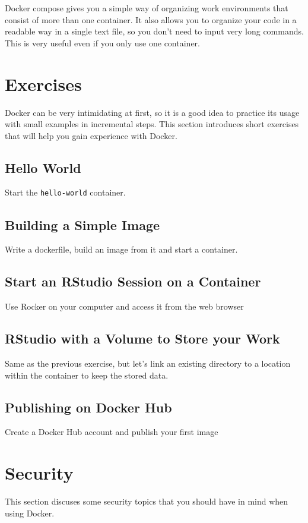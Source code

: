 \documentclass[]{book}
\begin{document}
Docker compose gives you a simple way of organizing work environments that consist of more than one container. It also allows you to organize your code in a readable way in a single text file, so you don't need to input very long commands. This is very useful even if you only use one container.

\hypertarget{exercises}{%
\chapter{Exercises}\label{exercises}}

Docker can be very intimidating at first, so it is a good idea to practice its usage with small examples in incremental steps. This section introduces short exercises that will help you gain experience with Docker.

\hypertarget{hello-world}{%
\section{Hello World}\label{hello-world}}

Start the \texttt{hello-world} container.

\hypertarget{building-a-simple-image}{%
\section{Building a Simple Image}\label{building-a-simple-image}}

Write a dockerfile, build an image from it and start a container.

\hypertarget{start-an-rstudio-session-on-a-container}{%
\section{Start an RStudio Session on a Container}\label{start-an-rstudio-session-on-a-container}}

Use Rocker on your computer and access it from the web browser

\hypertarget{rstudio-with-a-volume-to-store-your-work}{%
\section{RStudio with a Volume to Store your Work}\label{rstudio-with-a-volume-to-store-your-work}}

Same as the previous exercise, but let's link an existing directory to a location within the container to keep the stored data.

\hypertarget{publishing-on-docker-hub}{%
\section{Publishing on Docker Hub}\label{publishing-on-docker-hub}}

Create a Docker Hub account and publish your first image

\hypertarget{security}{%
\chapter{Security}\label{security}}

This section discuses some security topics that you should have in mind when using Docker.
\end{document}

